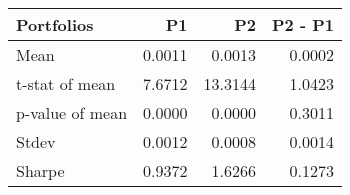 \begin{tabular}{lrrr}
\toprule
Portfolios & P1 & P2 & P2 - P1 \\
\midrule
Mean & 0.0011 & 0.0013 & 0.0002 \\
t-stat of mean & 7.6712 & 13.3144 & 1.0423 \\
p-value of mean & 0.0000 & 0.0000 & 0.3011 \\
Stdev & 0.0012 & 0.0008 & 0.0014 \\
Sharpe & 0.9372 & 1.6266 & 0.1273 \\
\bottomrule
\end{tabular}
